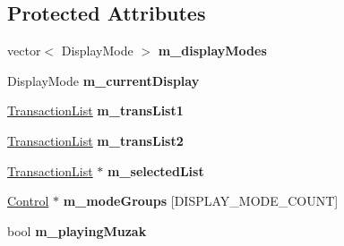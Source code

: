 \subsection*{Protected Attributes}
\begin{DoxyCompactItemize}
\item 
vector$<$ Display\+Mode $>$ {\bfseries m\+\_\+display\+Modes}\hypertarget{classBaseComputer_af669cf865fe3ae8071039860df17cbd6}{}\label{classBaseComputer_af669cf865fe3ae8071039860df17cbd6}

\item 
Display\+Mode {\bfseries m\+\_\+current\+Display}\hypertarget{classBaseComputer_a1e2489aa3ef2c936b1ecf4b9be79a154}{}\label{classBaseComputer_a1e2489aa3ef2c936b1ecf4b9be79a154}

\item 
\hyperlink{structBaseComputer_1_1TransactionList}{Transaction\+List} {\bfseries m\+\_\+trans\+List1}\hypertarget{classBaseComputer_af7335d4ef2009079e707f3e8486266ef}{}\label{classBaseComputer_af7335d4ef2009079e707f3e8486266ef}

\item 
\hyperlink{structBaseComputer_1_1TransactionList}{Transaction\+List} {\bfseries m\+\_\+trans\+List2}\hypertarget{classBaseComputer_abc7239a3a44d21316ac689fde130aa08}{}\label{classBaseComputer_abc7239a3a44d21316ac689fde130aa08}

\item 
\hyperlink{structBaseComputer_1_1TransactionList}{Transaction\+List} $\ast$ {\bfseries m\+\_\+selected\+List}\hypertarget{classBaseComputer_a0781ab4a51a8a88656c846d546733e5c}{}\label{classBaseComputer_a0781ab4a51a8a88656c846d546733e5c}

\item 
\hyperlink{classControl}{Control} $\ast$ {\bfseries m\+\_\+mode\+Groups} \mbox{[}D\+I\+S\+P\+L\+A\+Y\+\_\+\+M\+O\+D\+E\+\_\+\+C\+O\+U\+NT\mbox{]}\hypertarget{classBaseComputer_a5e378ba1683d4ff9f4e9fd9b49adbcf9}{}\label{classBaseComputer_a5e378ba1683d4ff9f4e9fd9b49adbcf9}

\item 
bool {\bfseries m\+\_\+playing\+Muzak}\hypertarget{classBaseComputer_a56c452eeaf66faf7810ded591a1d7bfe}{}\label{classBaseComputer_a56c452eeaf66faf7810ded591a1d7bfe}

\end{DoxyCompactItemize}
